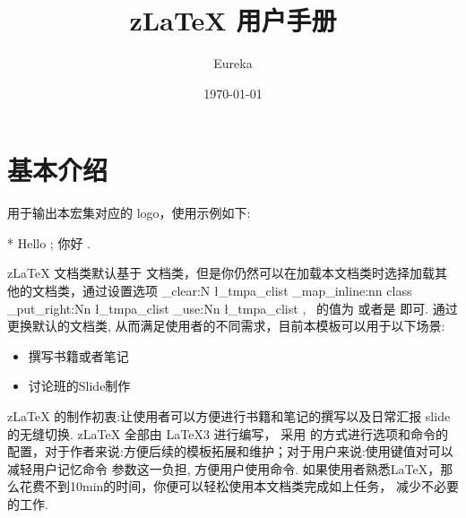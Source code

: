 \documentclass[
  lang=cn, 
  hyper=true,
  class=l3doc, 
]{../code/zlatex}
\title{z\LaTeX{} 用户手册}
\author{Eureka}
\date{\today}
\newcommand{\zkey}[1]{
  \clist_clear:N \l_tmpa_clist
  \clist_map_inline:nn {#1}{
    \clist_put_right:Nn \l_tmpa_clist {\meta{##1}}
  }
  \clist_use:Nn \l_tmpa_clist {,~}
}
\newcounter{DocExample}
\newcommand{\zlatex}{z\LaTeX{}}
\let\OzlatexThmLang\zlatexThmLang
\let\OzlatexThmCreate\zlatexThmCreate
\let\OzlatexThmStyle\zlatexThmStyle
\let\OzlatexMathAliasOpSet\zlatexMathAliasOpSet
\let\OzlatexThmTitleFormat\zlatexThmTitleFormat
\begin{document}
\let\zlatexThmLang\OzlatexThmLang
\let\zlatexThmCreate\OzlatexThmCreate
\let\zlatexThmStyle\OzlatexThmStyle
\let\zlatexMathAliasOpSet\OzlatexMathAliasOpSet
\let\zlatexThmTitleFormat\OzlatexThmTitleFormat
{}
\maketitle
\restoregeometry
% 
\thispagestyle{empty}
\tableofcontents
\clearpage


\section{基本介绍}
\begin{function}[updated=2024-11-05]{\zLaTeX}
  \begin{syntax}
  \end{syntax}
  用于输出本宏集对应的 logo，使用示例如下:
\end{function}
\begin{DocExample}*
  Hello \zLaTeX{}; 你好 \zLaTeX{}.
\end{DocExample}

\zlatex{} 文档类默认基于  文档类，但是你仍然可以在加载本文档类时选择加载其他的文档类，通过设置选项 \zkey{class} 的值为 
 或者是  即可. 通过更换默认的文档类, 从而满足使用者的不同需求，目前本模板可以用于以下场景:
\begin{itemize}
  \item 撰写书籍或者笔记
  \item 讨论班的Slide制作%
\end{itemize}

\zlatex{} 的制作初衷:让使用者可以方便进行书籍和笔记的撰写以及日常汇报 slide 的无缝切换. \zlatex{} 全部由 \LaTeX3 进行编写，
采用  的方式进行选项和命令的配置，对于作者来说:方便后续的模板拓展和维护；对于用户来说:使用键值对可以减轻用户记忆命令
参数这一负担, 方便用户使用命令. 如果使用者熟悉\LaTeX{}，那么花费不到10min的时间，你便可以轻松使用本文档类完成如上任务，
减少不必要的工作.
\end{document}
